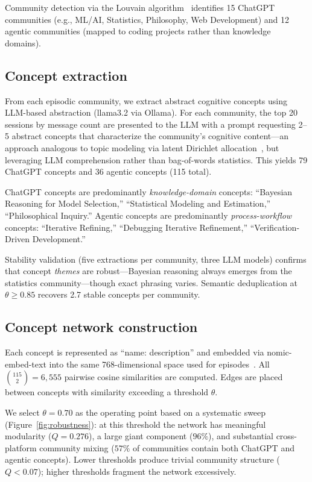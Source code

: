 \documentclass[11pt,twocolumn]{article}
\begin{document}
Community detection via the Louvain algorithm~\citep{blondel2008fast,newman2006modularity,fortunato2010community} identifies 15 ChatGPT communities (e.g., ML/AI, Statistics, Philosophy, Web Development) and 12 agentic communities (mapped to coding projects rather than knowledge domains).

\subsection{Concept extraction}
\label{sec:methods:concepts}

From each episodic community, we extract abstract cognitive concepts using LLM-based abstraction (llama3.2 via Ollama).
For each community, the top 20 sessions by message count are presented to the LLM with a prompt requesting 2--5 abstract concepts that characterize the community's cognitive content---an approach analogous to topic modeling via latent Dirichlet allocation~\citep{blei2003latent}, but leveraging LLM comprehension rather than bag-of-words statistics.
This yields 79 ChatGPT concepts and 36 agentic concepts (115 total).

ChatGPT concepts are predominantly \emph{knowledge-domain} concepts: ``Bayesian Reasoning for Model Selection,'' ``Statistical Modeling and Estimation,'' ``Philosophical Inquiry.''
Agentic concepts are predominantly \emph{process-workflow} concepts: ``Iterative Refining,'' ``Debugging Iterative Refinement,'' ``Verification-Driven Development.''

Stability validation (five extractions per community, three LLM models) confirms that concept \emph{themes} are robust---Bayesian reasoning always emerges from the statistics community---though exact phrasing varies.
Semantic deduplication at $\theta \geq 0.85$ recovers 2.7 stable concepts per community.

\subsection{Concept network construction}
\label{sec:methods:network}

Each concept is represented as ``name: description'' and embedded via nomic-embed-text into the same 768-dimensional space used for episodes~\citep{veremyev2019graph}.
All $\binom{115}{2} = 6{,}555$ pairwise cosine similarities are computed.
Edges are placed between concepts with similarity exceeding a threshold $\theta$.

We select $\theta = 0.70$ as the operating point based on a systematic sweep (Figure~\ref{fig:robustness}):
at this threshold the network has meaningful modularity ($Q = 0.276$), a large giant component ($96\%$), and substantial cross-platform community mixing ($57\%$ of communities contain both ChatGPT and agentic concepts).
Lower thresholds produce trivial community structure ($Q < 0.07$); higher thresholds fragment the network excessively.
\end{document}
